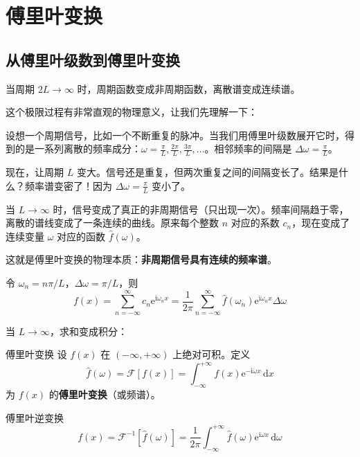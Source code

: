 \section{傅里叶变换}

\subsection{从傅里叶级数到傅里叶变换}

当周期 $2L \to \infty$ 时，周期函数变成非周期函数，离散谱变成连续谱。

这个极限过程有非常直观的物理意义，让我们先理解一下：

\begin{tishi}
设想一个周期信号，比如一个不断重复的脉冲。当我们用傅里叶级数展开它时，得到的是一系列离散的频率成分：$\omega = \frac{\pi}{L}, \frac{2\pi}{L}, \frac{3\pi}{L}, \ldots$。相邻频率的间隔是 $\Delta\omega = \frac{\pi}{L}$。

现在，让周期 $L$ 变大。信号还是重复，但两次重复之间的间隔变长了。结果是什么？频率谱变密了！因为 $\Delta\omega = \frac{\pi}{L}$ 变小了。

当 $L \to \infty$ 时，信号变成了真正的非周期信号（只出现一次）。频率间隔趋于零，离散的谱线变成了一条连续的曲线。原来每个整数 $n$ 对应的系数 $c_n$，现在变成了连续变量 $\omega$ 对应的函数 $\hat{f}(\omega)$。

这就是傅里叶变换的物理本质：\textbf{非周期信号具有连续的频率谱}。
\end{tishi}

令 $\omega_n = n\pi/L$，$\Delta\omega = \pi/L$，则
\begin{equation}
    f(x) = \sum_{n=-\infty}^{\infty} c_n\mathrm{e}^{\mathrm{i}\omega_n x} = \frac{1}{2\pi}\sum_{n=-\infty}^{\infty} \hat{f}(\omega_n)\mathrm{e}^{\mathrm{i}\omega_n x}\Delta\omega
\end{equation}

当 $L \to \infty$，求和变成积分：

\begin{dingliyi}{}{傅里叶变换}
设 $f(x)$ 在 $(-\infty, +\infty)$ 上绝对可积。定义
\begin{equation}
    \hat{f}(\omega) = \mathcal{F}[f(x)] = \int_{-\infty}^{+\infty} f(x)\mathrm{e}^{-\mathrm{i}\omega x}\,\mathrm{d}x
\end{equation}
为 $f(x)$ 的\textbf{傅里叶变换}（或频谱）。
\end{dingliyi}

\begin{dingliyi}{}{傅里叶逆变换}
\begin{equation}
    f(x) = \mathcal{F}^{-1}[\hat{f}(\omega)] = \frac{1}{2\pi}\int_{-\infty}^{+\infty} \hat{f}(\omega)\mathrm{e}^{\mathrm{i}\omega x}\,\mathrm{d}\omega
\end{equation}
\end{dingliyi}

